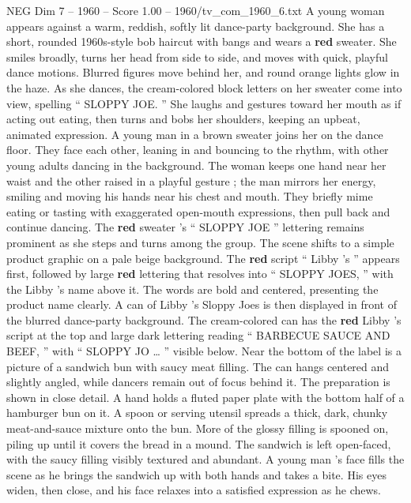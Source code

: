 \begin{textsample}{NEG Dim 7 – 1960 – Score 1.00 – 1960/tv\_com\_1960\_6.txt}  \label{ex:f7_neg_075}
A young woman appears against a warm, reddish, softly lit dance-party background.
She has a short, rounded 1960s-style bob haircut with bangs and wears a \textbf{red} sweater.
She smiles broadly, turns her head from side to side, and moves with quick, playful dance motions.
Blurred figures move behind her, and round orange lights glow in the haze.
As she dances, the cream-colored block letters on her sweater come into view, spelling “ SLOPPY JOE. ” She laughs and gestures toward her mouth as if acting out eating, then turns and bobs her shoulders, keeping an upbeat, animated expression.
A young man in a brown sweater joins her on the dance floor.
They face each other, leaning in and bouncing to the rhythm, with other young adults dancing in the background.
The woman keeps one hand near her waist and the other raised in a playful gesture ; the man mirrors her energy, smiling and moving his hands near his chest and mouth.
They briefly mime eating or tasting with exaggerated open-mouth expressions, then pull back and continue dancing.
The \textbf{red} sweater ’s “ SLOPPY JOE ” lettering remains prominent as she steps and turns among the group.
The scene shifts to a simple product graphic on a pale beige background.
The \textbf{red} script “ Libby ’s ” appears first, followed by large \textbf{red} lettering that resolves into “ SLOPPY JOES, ” with the Libby ’s name above it.
The words are bold and centered, presenting the product name clearly.
A can of Libby ’s Sloppy Joes is then displayed in front of the blurred dance-party background.
The cream-colored can has the \textbf{red} Libby ’s script at the top and large dark lettering reading “ BARBECUE SAUCE AND BEEF, ” with “ SLOPPY JO … ” visible below.
Near the bottom of the label is a picture of a sandwich bun with saucy meat filling.
The can hangs centered and slightly angled, while dancers remain out of focus behind it.
The preparation is shown in close detail.
A hand holds a fluted paper plate with the bottom half of a hamburger bun on it.
A spoon or serving utensil spreads a thick, dark, chunky meat-and-sauce mixture onto the bun.
More of the glossy filling is spooned on, piling up until it covers the bread in a mound.
The sandwich is left open-faced, with the saucy filling visibly textured and abundant.
A young man ’s face fills the scene as he brings the sandwich up with both hands and takes a bite.
His eyes widen, then close, and his face relaxes into a satisfied expression as he chews.

\end{textsample}
